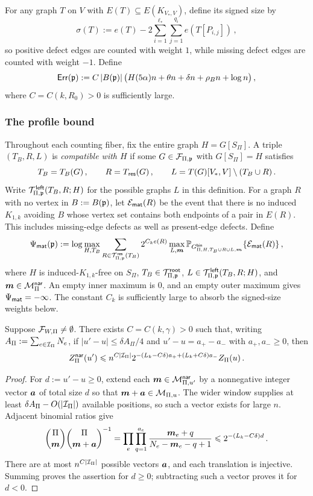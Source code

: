 For any graph $T$ on $V$ with $E(T)\subseteq E(K_{V_\ast,V})$, define its signed size by
$$\sigma(T):=e(T)-2\sum_{i=1}^{\ell_\ast}\sum_{j=1}^{q_i}e(T[P_{i,j}])\,,$$
so positive defect edges are counted with weight $1$, while missing defect edges are counted with weight $-1$. Define
$${\mathsf{Err}}({\mathfrak p}):=C\,|B({\mathfrak p})|\,\bigl(H(5\alpha)n+\theta n+\delta n+\rho_Bn+\log n\bigr)\,,$$
where $C=C(k,R_0)>0$ is sufficiently large.

\subsubsection{The profile bound}\label{subsec:profile-count-K1k}
Throughout each counting fiber, fix the entire graph $H=G[S_\Pi]$. A triple $(T_B,R,L)$ is \emph{compatible with $H$} if some $G\in{\mathcal F}_{\Pi,{\mathfrak p}}$ with $G[S_\Pi]=H$ satisfies
$$T_B=T_B(G)\,,\qquad R=T_{\hspace{0.2mm}\mathsf{res}}(G)\,,\qquad L=T(G)[V_\ast,V]\setminus(T_B\cup R)\,.$$
Write ${\mathcal T}^{\hspace{0.2mm}\mathsf{left}}_{\Pi,{\mathfrak p}}(T_B,R;H)$ for the possible graphs $L$ in this definition. For a graph $R$ with no vertex in $B:=B({\mathfrak p})$, let ${\mathcal E}_{\mathsf{mat}}(R)$ be the event that there is no induced $K_{1,k}$ avoiding $B$ whose vertex set contains both endpoints of a pair in $E(R)$. This includes missing-edge defects as well as present-edge defects. Define
\begin{equation}\label{eqn:Psi-mat-definition-K1k}
\Psi_{\mathsf{mat}}({\mathfrak p}):=\log\max_{H,T_B}\sum_{R\in{\mathcal T}^{\hspace{0.2mm}\mathsf{res}}_{\Pi,{\mathfrak p}}(T_B)}2^{C_ke(R)}\max_{L,\boldsymbol{m}}{\mathbb P}_{G^{\mathsf{bin}}_{\Pi,H,T_B\cup R\cup L,\boldsymbol{m}}}\{{\mathcal E}_{\mathsf{mat}}(R)\}\,,
\end{equation}
where $H$ is induced-$K_{1,k}$-free on $S_\Pi$, $T_B\in{\mathcal T}^{\mathsf{root}}_{\Pi,{\mathfrak p}}$, $L\in{\mathcal T}^{\hspace{0.2mm}\mathsf{left}}_{\Pi,{\mathfrak p}}(T_B,R;H)$, and $\boldsymbol{m}\in{\mathcal M}^{\mathsf{nar}}_\Pi$. An empty inner maximum is $0$, and an empty outer maximum gives $\Psi_{\mathsf{mat}}=-\infty$. The constant $C_k$ is sufficiently large to absorb the signed-size weights below.

\begin{lemma}\label{lemma:active-level-comparison-K1k}
Suppose ${\mathcal F}_{W,\Pi}\neq\emptyset$. There exists $C=C(k,\gamma)>0$ such that, writing $A_\Pi:=\sum_{e\in{\mathcal I}_\Pi}N_e$, if $|u'-u|\leq\delta A_\Pi/4$ and $u'-u=a_+-a_-$ with $a_+,a_-\geq0$, then
$$Z^{\mathsf{nar}}_\Pi(u')\leqslant n^{C|{\mathcal I}_\Pi|}2^{-(L_k-C\delta)a_++(L_k+C\delta)a_-}Z_\Pi(u)\,.$$
\end{lemma}
\begin{proof}
For $d:=u'-u\geq0$, extend each $\boldsymbol{m}\in{\mathcal M}^{\mathsf{nar}}_{\Pi,u'}$ by a nonnegative integer vector $\boldsymbol{a}$ of total size $d$ so that $\boldsymbol{m}+\boldsymbol{a}\in{\mathcal M}_{\Pi,u}$. The wider window supplies at least $\delta A_\Pi-O(|{\mathcal I}_\Pi|)$ available positions, so such a vector exists for large $n$. Adjacent binomial ratios give
$$\binom{\Pi}{\boldsymbol{m}}\binom{\Pi}{\boldsymbol{m}+\boldsymbol{a}}^{-1}=\prod_e\prod_{q=1}^{a_e}\frac{\boldsymbol{m}_e+q}{N_e-\boldsymbol{m}_e-q+1}\leqslant2^{-(L_k-C\delta)d}\,.$$
There are at most $n^{C|{\mathcal I}_\Pi|}$ possible vectors $\boldsymbol{a}$, and each translation is injective. Summing proves the assertion for $d\geq0$; subtracting such a vector proves it for $d<0$.
\end{proof}

